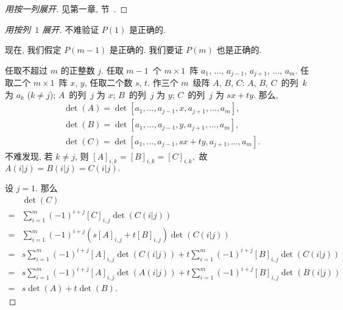 \begin{proof}[用按一列展开]
    见第一章, 节~.
\end{proof}

\begin{proof}[用按列~\(1\) 展开]
    不难验证 \(P(1)\) 是正确的.

    现在, 我们假定 \(P(m-1)\) 是正确的.
    我们要证 \(P(m)\) 也是正确的.

    任取不超过 \(m\) 的正整数 \(j\).
    任取 \(m-1\)~个 \(m \times 1\)~阵
    \(a_1\), \(\dots\), \(a_{j-1}\),
    \(a_{j+1}\), \(\dots\), \(a_m\).
    任取二个 \(m \times 1\)~阵 \(x\), \(y\),
    任取二个数 \(s\), \(t\).
    作三个 \(m\)~级阵 \(A\), \(B\), \(C\):
    \(A\), \(B\), \(C\)~的列~\(k\) 为 \(a_k\) (\(k \neq j\));
    \(A\)~的列~\(j\) 为 \(x\);
    \(B\)~的列~\(j\) 为 \(y\);
    \(C\)~的列~\(j\) 为 \(sx + ty\).
    那么,
    \begin{align*}
         & \det {(A)}
        = \det
        {[a_1, \dots, a_{j-1}, x, a_{j+1}, \dots, a_m]},
        \\
         & \det {(B)}
        = \det
        {[a_1, \dots, a_{j-1}, y, a_{j+1}, \dots, a_m]},
        \\
         & \det {(C)}
        = \det
        {[a_1, \dots, a_{j-1}, sx + ty, a_{j+1}, \dots, a_m]}.
    \end{align*}
    不难发现, 若 \(k \neq j\), 则
    \(
    [A]_{i,k} = [B]_{i,k} = [C]_{i,k},
    \)
    故
    \(
    A(i|j) = B(i|j) = C(i|j).
    \)

    设 \(j = 1\).
    那么
    \begin{align*}
             & \det {(C)}
        \\
        = {} &
        \sum_{i = 1}^{m} {
        (-1)^{i+j} [C]_{i,j} \det {(C(i|j))}
        }
        \\
        = {} &
        \sum_{i = 1}^{m} {
        (-1)^{i+j} (s[A]_{i,j} + t[B]_{i,j}) \det {(C(i|j))}
        }
        \\
        = {} &
        s\sum_{i = 1}^{m} {
        (-1)^{i+j} [A]_{i,j} \det {(C(i|j))}
        }
        +
        t\sum_{i = 1}^{m} {
        (-1)^{i+j} [B]_{i,j} \det {(C(i|j))}
        }
        \\
        = {} &
        s\sum_{i = 1}^{m} {
        (-1)^{i+j} [A]_{i,j} \det {(A(i|j))}
        }
        +
        t\sum_{i = 1}^{m} {
        (-1)^{i+j} [B]_{i,j} \det {(B(i|j))}
        }
        \\
        = {} &
        s \det{(A)} + t \det{(B)}.
    \end{align*}


\end{proof}
